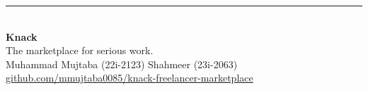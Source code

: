\documentclass[12pt,a4paper]{article}
\begin{document}
\vspace{1cm}
\begin{center}
  \rule{0.6\linewidth}{0.4pt}\\[0.3cm]
  {\large\textbf{\textcolor{brand}{Knack}}}\\
  {\small The marketplace for serious work.}\\[0.2cm]
  {\small Muhammad Mujtaba (22i-2123) \quad Shahmeer (23i-2063)}\\[0.2cm]
  {\small \href{https://github.com/mmujtaba0085/knack-freelancer-marketplace}{github.com/mmujtaba0085/knack-freelancer-marketplace}}
\end{center}
\end{document}
